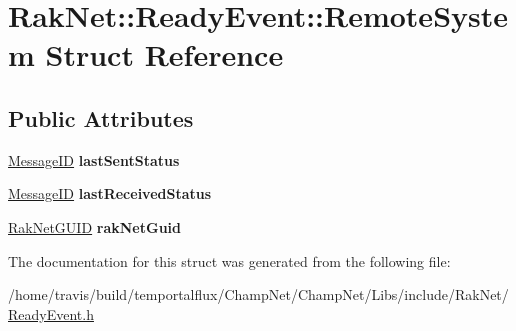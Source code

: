 \hypertarget{struct_rak_net_1_1_ready_event_1_1_remote_system}{\section{Rak\-Net\-:\-:Ready\-Event\-:\-:Remote\-System Struct Reference}
\label{struct_rak_net_1_1_ready_event_1_1_remote_system}
}
\subsection*{Public Attributes}
\begin{DoxyCompactItemize}
\item 
\hypertarget{struct_rak_net_1_1_ready_event_1_1_remote_system_aec4612b2a51b3b42a5c4dd6937981c63}{\hyperlink{namespace_rak_net_a1b2f3bf4bad2bb6a8360a12295fbed0c}{Message\-I\-D} {\bfseries last\-Sent\-Status}}\label{struct_rak_net_1_1_ready_event_1_1_remote_system_aec4612b2a51b3b42a5c4dd6937981c63}

\item 
\hypertarget{struct_rak_net_1_1_ready_event_1_1_remote_system_ab3fedea70af64b3d003be5a81a14da52}{\hyperlink{namespace_rak_net_a1b2f3bf4bad2bb6a8360a12295fbed0c}{Message\-I\-D} {\bfseries last\-Received\-Status}}\label{struct_rak_net_1_1_ready_event_1_1_remote_system_ab3fedea70af64b3d003be5a81a14da52}

\item 
\hypertarget{struct_rak_net_1_1_ready_event_1_1_remote_system_a883a9cbdfdbc6cfe807e357d276c6d14}{\hyperlink{struct_rak_net_1_1_rak_net_g_u_i_d}{Rak\-Net\-G\-U\-I\-D} {\bfseries rak\-Net\-Guid}}\label{struct_rak_net_1_1_ready_event_1_1_remote_system_a883a9cbdfdbc6cfe807e357d276c6d14}

\end{DoxyCompactItemize}


The documentation for this struct was generated from the following file\-:\begin{DoxyCompactItemize}
\item 
/home/travis/build/temportalflux/\-Champ\-Net/\-Champ\-Net/\-Libs/include/\-Rak\-Net/\hyperlink{_ready_event_8h}{Ready\-Event.\-h}\end{DoxyCompactItemize}
